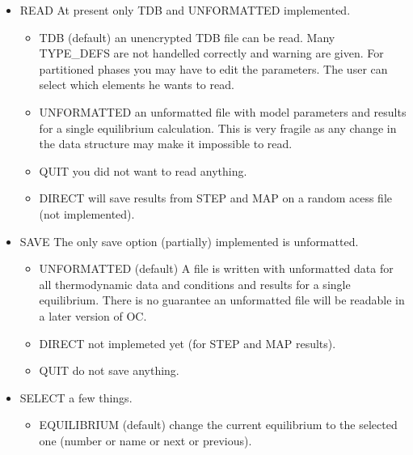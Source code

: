 \documentclass[12pt]{article}
\begin{document}
\begin{itemize}
\begin{itemize}
  \end{itemize}
\item READ At present only TDB and UNFORMATTED implemented.
  \begin{itemize}
  \item TDB (default) an unencrypted TDB file can be read.  Many
    TYPE\_DEFS are not handelled correctly and warning are given.  For
    partitioned phases you may have to edit the parameters.  The user
    can select which elements he wants to read.
  \item UNFORMATTED an unformatted file with model parameters and
    results for a single equilibrium calculation.  This is very fragile
    as any change in the data structure may make it impossible to read.
  \item QUIT you did not want to read anything.
  \item DIRECT will save results from STEP and MAP on a random acess
    file (not implemented).
  \end{itemize}
\item SAVE The only save option (partially) implemented is
  unformatted.
  \begin{itemize}
  \item UNFORMATTED (default) A file is written with unformatted data
    for all thermodynamic data and conditions and results for a single
    equilibrium.  There is no guarantee an unformatted file will be
    readable in a later version of OC.
  \item DIRECT not implemeted yet (for STEP and MAP results).
  \item QUIT do not save anything.
  \end{itemize}
\item SELECT a few things.
  \begin{itemize}
  \item EQUILIBRIUM (default) change the current equilibrium to the
    selected one (number or name or next or previous).

\end{itemize}
\end{itemize}
\end{document}
